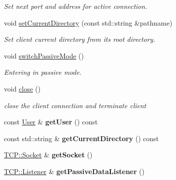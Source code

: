 \begin{DoxyCompactItemize}
\begin{DoxyCompactList}\small\item\em Set next port and address for active connection. \end{DoxyCompactList}\item 
void \hyperlink{classFTP_1_1Client_a545b1a0a22f36391a6ee8f8563012fa6}{set\+Current\+Directory} (const std\+::string \&pathname)
\begin{DoxyCompactList}\small\item\em Set client current directory from its root directory. \end{DoxyCompactList}\item 
\hypertarget{classFTP_1_1Client_a57cd373e14fbd270455df91ddf0ac0e7}{}void \hyperlink{classFTP_1_1Client_a57cd373e14fbd270455df91ddf0ac0e7}{switch\+Passive\+Mode} ()\label{classFTP_1_1Client_a57cd373e14fbd270455df91ddf0ac0e7}

\begin{DoxyCompactList}\small\item\em Entering in passive mode. \end{DoxyCompactList}\item 
\hypertarget{classFTP_1_1Client_a78f23a9b26bbf98f9fb9b266552d94bb}{}void \hyperlink{classFTP_1_1Client_a78f23a9b26bbf98f9fb9b266552d94bb}{close} ()\label{classFTP_1_1Client_a78f23a9b26bbf98f9fb9b266552d94bb}

\begin{DoxyCompactList}\small\item\em close the client connection and terminate client \end{DoxyCompactList}\item 
\hypertarget{classFTP_1_1Client_abf9b8beac9e9769c78244de4406451d6}{}const \hyperlink{structFTP_1_1User}{User} \& {\bfseries get\+User} () const \label{classFTP_1_1Client_abf9b8beac9e9769c78244de4406451d6}

\item 
\hypertarget{classFTP_1_1Client_ab5f9b53875bb0847045e056a8f9f8073}{}const std\+::string \& {\bfseries get\+Current\+Directory} () const \label{classFTP_1_1Client_ab5f9b53875bb0847045e056a8f9f8073}

\item 
\hypertarget{classFTP_1_1Client_a285e48c50c37c7dd7832a3731182b362}{}\hyperlink{classFTP_1_1TCP_1_1Socket}{T\+C\+P\+::\+Socket} \& {\bfseries get\+Socket} ()\label{classFTP_1_1Client_a285e48c50c37c7dd7832a3731182b362}

\item 
\hypertarget{classFTP_1_1Client_add44878cec59e5f08b68504e0756a87e}{}\hyperlink{classFTP_1_1TCP_1_1Listener}{T\+C\+P\+::\+Listener} \& {\bfseries get\+Passive\+Data\+Listener} ()\label{classFTP_1_1Client_add44878cec59e5f08b68504e0756a87e}

\end{DoxyCompactItemize}


